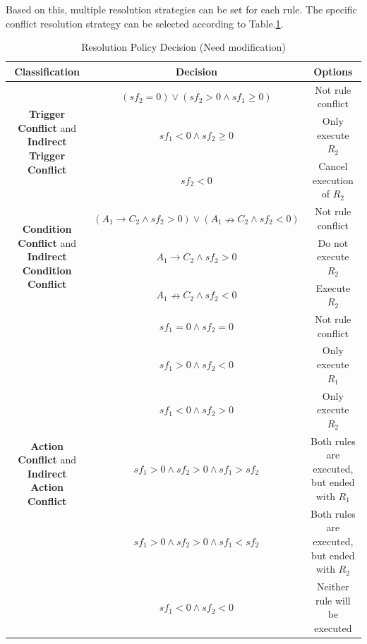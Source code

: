 Based on this, multiple resolution strategies can be set for each rule. The specific conflict resolution strategy can be selected according to Table.\ref{Resolution_Policy_Decision}.

\begin{table}[htbp]
	\begin{center}
		\caption{Resolution Policy Decision (Need modification)}
		\label{Resolution_Policy_Decision}
		\begin{tabular}{c|c|c}
			\hline
			\textbf{Classification} & \textbf{Decision} & \textbf{Options} \\
			\hline
			\multirow{3}{*}{\textbf{Trigger Conflict} and \textbf{Indirect Trigger Conflict}} 
			& $(sf_2 = 0)\vee(sf_2>0 \wedge sf_1\geq 0)$ & Not rule conflict \\
			\cline{2-3}
			& $sf_1 < 0 \land sf_2 \geq 0$ & Only execute $R_2$ \\
			\cline{2-3}
			& $sf_2 < 0$ & Cancel execution of $R_2$ \\
			\hline
			\multirow{3}{*}{\textbf{Condition Conflict} and \textbf{Indirect Condition Conflict}} 
			& $(A_{1}\rightarrow C_{2}\wedge sf_{2}>0)\vee(A_{1}\nrightarrow C_{2}\wedge sf_{2}<0)$ & Not rule conflict \\
			\cline{2-3}
			& $A_{1}\rightarrow C_{2}\wedge sf_{2}>0$ & Do not execute $R_2$\\
			\cline{2-3}
			& $A_{1}\nrightarrow C_{2}\wedge sf_{2}<0$ & Execute $R_2$ \\
			\hline
			\multirow{6}{*}{\textbf{Action Conflict} and \textbf{Indirect Action Conflict}} 
			& $sf_1 = 0 \land sf_2 = 0$ & Not rule conflict \\
			\cline{2-3}
			& $sf_1 > 0 \land sf_2 < 0$ & Only execute $R_1$ \\
			\cline{2-3}
			& $sf_1 < 0 \land sf_2 > 0$ & Only execute $R_2$ \\
			\cline{2-3}
			& $sf_1 > 0 \land sf_2 > 0 \land sf_1 > sf_2$ & Both rules are executed, but ended with $R_1$ \\
			\cline{2-3}
			& $sf_1 > 0 \land sf_2 > 0 \land sf_1 < sf_2$ & Both rules are executed, but ended with $R_2$ \\
			\cline{2-3}
			& $sf_1 < 0 \land sf_2 < 0$ & Neither rule will be executed \\
			\hline
		\end{tabular}
	\end{center}
\end{table}

